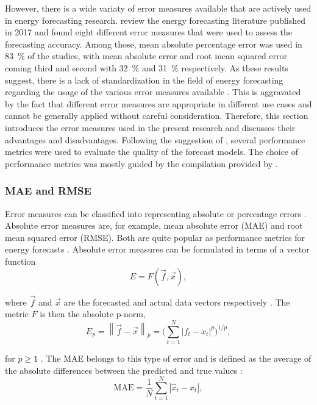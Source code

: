 However, there is a wide variaty of error measures available that are actively used in energy forecasting research. \citet{zor:2017} review the energy forecasting literature published in 2017 and found eight different error measures that were used to assess the forecasting accuracy. Among those, mean absolute percentage error was used in 83~\% of the studies, with mean absolute error and root mean squared error coming third and second with 32~\% and 31~\% respectively. As these results suggest, there is a lack of standardization in the field of energy forecasting regarding the usage of the various error measures available \citep[see also][]{Meer:2018}. This is aggravated by the fact that different error measures are appropriate in different use cases and cannot be generally applied without careful consideration. Therefore, this section introduces the error measures used in the present research and discusses their advantages and disadvantages. Following the suggestion of \citet{Hoff:2013}, several performance metrics were used to evaluate the quality of the forecast models. The choice of performance metrics was mostly guided by the compilation provided by \citet{Meer:2018}.


\subsubsection{MAE and RMSE}

Error measures can be classified into representing absolute or percentage errors \citep{Hoff:2013}. Absolute error measures are, for example, mean absolute error (MAE) and root mean squared error (RMSE). Both are quite popular as performance metrics for energy forecasts \citep{zor:2017}. Absolute error measures can be formulated in terms of a vector function 
%
\begin{equation} \label{Eq:vectorfunction}
    E=F\left(\vec{f}, \vec{x}\right),
\end{equation}

\noindent where $\vec{f}$ and $\vec{x}$ are the forecasted and actual data vectors respectively \citep{Haben:2014}. The metric $F$ is then the absolute p-norm,
%
\begin{equation} \label{Eq:pnorm}
    E_p=\left\lVert\vec{f}-\vec{x}\right\rVert_p=\biggl(\sum_{t=1}^N \left|f_t-x_t\right|^p\biggr)^{1/p},
\end{equation}

\noindent for $p\geq1$ \citep[][p. 52]{golub:2012}. The MAE belongs to this type of error and is defined as the average of the absolute differences between the predicted and true values \citep{Hoff:2013}:
%
\begin{equation} \label{Eq:MAE}
\text{MAE}=\frac{1}{N}\sum_{t=1}^N\left|\widehat{x}_t-x_t\right|,    
\end{equation}

